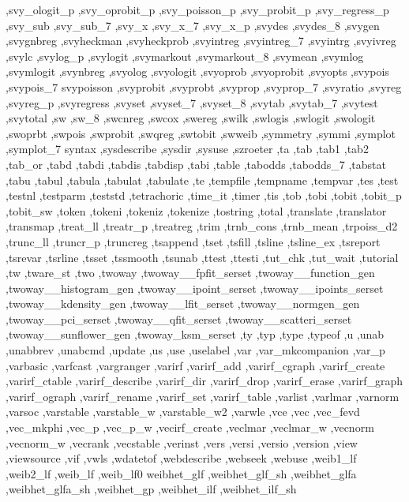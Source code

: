 {{    ,svy_ologit_p ,svy_oprobit_p ,svy_poisson_p ,svy_probit_p
    ,svy_regress_p ,svy_sub ,svy_sub_7 ,svy_x ,svy_x_7 ,svy_x_p ,svydes
    ,svydes_8 ,svygen ,svygnbreg ,svyheckman ,svyheckprob ,svyintreg
    ,svyintreg_7 ,svyintrg ,svyivreg ,svylc ,svylog_p ,svylogit
    ,svymarkout ,svymarkout_8 ,svymean ,svymlog ,svymlogit ,svynbreg
    ,svyolog ,svyologit ,svyoprob ,svyoprobit ,svyopts ,svypois
    ,svypois_7 svypoisson ,svyprobit ,svyprobt ,svyprop ,svyprop_7
    ,svyratio ,svyreg ,svyreg_p ,svyregress ,svyset ,svyset_7 ,svyset_8
    ,svytab ,svytab_7 ,svytest ,svytotal ,sw ,sw_8 ,swcnreg ,swcox
    ,swereg ,swilk ,swlogis ,swlogit ,swologit ,swoprbt ,swpois
    ,swprobit ,swqreg ,swtobit ,swweib ,symmetry ,symmi ,symplot
    ,symplot_7 syntax ,sysdescribe ,sysdir ,sysuse ,szroeter ,ta ,tab
    ,tab1 ,tab2 ,tab_or ,tabd ,tabdi ,tabdis ,tabdisp ,tabi ,table
    ,tabodds ,tabodds_7 ,tabstat ,tabu ,tabul ,tabula ,tabulat ,tabulate
    ,te ,tempfile ,tempname ,tempvar ,tes ,test ,testnl ,testparm
    ,teststd ,tetrachoric ,time_it ,timer ,tis ,tob ,tobi ,tobit
    ,tobit_p ,tobit_sw ,token ,tokeni ,tokeniz ,tokenize ,tostring
    ,total ,translate ,translator ,transmap ,treat_ll ,treatr_p
    ,treatreg ,trim ,trnb_cons ,trnb_mean ,trpoiss_d2 ,trunc_ll
    ,truncr_p ,truncreg ,tsappend ,tset ,tsfill ,tsline ,tsline_ex
    ,tsreport ,tsrevar ,tsrline ,tsset ,tssmooth ,tsunab ,ttest
    ,ttesti ,tut_chk ,tut_wait ,tutorial ,tw ,tware_st ,two ,twoway
    ,twoway__fpfit_serset ,twoway__function_gen ,twoway__histogram_gen
    ,twoway__ipoint_serset ,twoway__ipoints_serset ,twoway__kdensity_gen
    ,twoway__lfit_serset ,twoway__normgen_gen ,twoway__pci_serset
    ,twoway__qfit_serset ,twoway__scatteri_serset ,twoway__sunflower_gen
    ,twoway_ksm_serset ,ty ,typ ,type ,typeof ,u ,unab ,unabbrev
    ,unabcmd ,update ,us ,use ,uselabel ,var ,var_mkcompanion
    ,var_p ,varbasic ,varfcast ,vargranger ,varirf ,varirf_add
    ,varirf_cgraph ,varirf_create ,varirf_ctable ,varirf_describe
    ,varirf_dir ,varirf_drop ,varirf_erase ,varirf_graph ,varirf_ograph
    ,varirf_rename ,varirf_set ,varirf_table ,varlist ,varlmar
    ,varnorm ,varsoc ,varstable ,varstable_w ,varstable_w2 ,varwle
    ,vce ,vec ,vec_fevd ,vec_mkphi ,vec_p ,vec_p_w ,vecirf_create
    ,veclmar ,veclmar_w ,vecnorm ,vecnorm_w ,vecrank ,vecstable
    ,verinst ,vers ,versi ,versio ,version ,view ,viewsource ,vif
    ,vwls ,wdatetof ,webdescribe ,webseek ,webuse ,weib1_lf ,weib2_lf
    ,weib_lf ,weib_lf0 weibhet_glf ,weibhet_glf_sh ,weibhet_glfa
    ,weibhet_glfa_sh ,weibhet_gp ,weibhet_ilf ,weibhet_ilf_sh
}}
